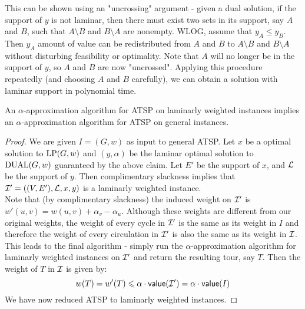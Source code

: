 \documentclass[./main.tex]{subfiles}
\begin{document}
	This can be shown using an "uncrossing" argument - given a dual solution, if the support of $y$ is not laminar, then there must exist two sets in its support, say $A$ and $B$, such that $A\setminus B$ and $B\setminus A$ are nonempty.
	WLOG, assume that $y_A \leqslant y_B$. Then $y_A$ amount of value can be redistributed from $A$ and $B$ to $A\setminus B$ and $B\setminus A$ without disturbing feasibility or optimality.
	Note that $A$ will no longer be in the support of $y$, so $A$ and $B$ are now "uncrossed".
	Applying this procedure repeatedly (and choosing $A$ and $B$ carefully), we can obtain a solution with laminar support in polynomial time.\\
		\begin{theorem}
			An $\alpha$-approximation algorithm for ATSP on laminarly weighted instances implies an $\alpha$-approximation algorithm for ATSP on general instances.
		\end{theorem}
		\begin{proof}
			We are given $I=(G,w)$ as input to general ATSP. Let $x$ be a optimal solution to $\textup{LP}(G,w)$ and $(y,\alpha)$ be the laminar optimal solution to $\textup{DUAL}(G,w)$ guaranteed by the above claim.
			Let $E'$ be the support of $x$, and $\mathcal{L}$ be the support of $y$. Then complimentary slackness implies that $\mathcal{I}'=((V,E'), \mathcal{L}, x, y)$ is a laminarly weighted instance.\vspace{2mm}\\
			Note that (by complimentary slackness) the induced weight on $\mathcal{I}'$ is $w'(u,v) = w(u,v) + \alpha_v - \alpha_u$. Although these weights are different from our original weights, the weight of every cycle in $\mathcal{I}'$ is the same as its weight in $I$ and therefore the weight of every circulation in $\mathcal{I}'$ is also the same as its weight in $\mathcal{I}$.
			This leads to the final algorithm - simply run the $\alpha$-approximation algorithm for laminarly weighted instances on $\mathcal{I}'$ and return the resulting tour, say $T$.
			Then the weight of $T$ in $\mathcal{I}$ is given by:
			\[
				w(T) = w'(T)\leqslant \alpha\cdot \textsf{\textup{value}}(\mathcal{I}') = \alpha\cdot\textsf{\textup{value}}(I)
			\]
			We have now reduced ATSP to laminarly weighted instances.
		\end{proof}
\end{document}

